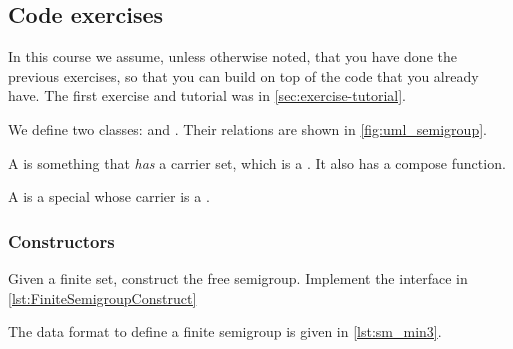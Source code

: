 \subsection{Code exercises}

\begin{remark}
  In this course we assume, unless otherwise noted, that you have done the previous exercises, so that you can build on top of the code that you already have. The first exercise and tutorial was in \cref{sec:exercise-tutorial}.
\end{remark}

\begin{figure*}[b]\label{fig:uml_semigroup}
\end{figure*}

We define two classes: \Semigroup and \FiniteSemigroup.
Their relations are shown in \cref{fig:uml_semigroup}.

A \Semigroup is something that \emph{has} a carrier set, which is a \Setoid.
It also has a compose function.

\begin{longcode}
\caption{}
\label{lst:Semigroup}
\end{longcode}

A \FiniteSemigroup is a special \Semigroup whose carrier is a \FiniteSet.

\begin{longcode}
\caption{}
\label{lst:FiniteSemigroup}
\end{longcode}



\subsubsection*{Constructors}

\begin{gradedexercise}
  \label{ex:FiniteSemigroupRepresentation}
  Given a finite set, construct the free semigroup.
  Implement the interface in \cref{lst:FiniteSemigroupConstruct}
\end{gradedexercise}


\begin{longcode}
\caption{}
\label{lst:FiniteSemigroupConstruct}
\end{longcode}


The data format to define a finite semigroup is given in \cref{lst:sm_min3}.


